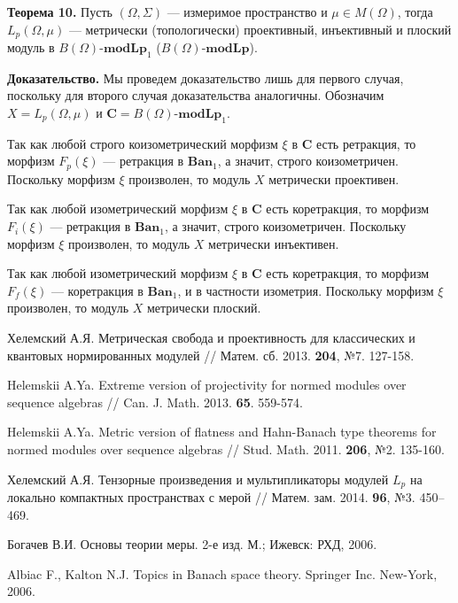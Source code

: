\documentclass[11pt,twoside]{article}
\begin{document}
\textbf{Теорема 10.} Пусть $(\Omega,\Sigma)$ --- измеримое пространство и $\mu\in M(\Omega)$, тогда $L_p(\Omega,\mu)$ --- метрически (топологически) проективный, инъективный и плоский модуль в $B(\Omega)$-$\mathbf{modLp}_1$ ($B(\Omega)$-$\mathbf{modLp}$).

\textbf{Доказательство.} Мы проведем доказательство лишь для первого случая, поскольку для второго случая доказательства аналогичны. Обозначим $X=L_p(\Omega,\mu)$ и $\mathbf{C}=B(\Omega)$-$\mathbf{modLp}_1$.  

Так как любой строго коизометрический морфизм $\xi$ в $\mathbf{C}$ есть ретракция, то морфизм $F_p(\xi)$ --- ретракция в $\mathbf{Ban}_1$, а значит, строго коизометричен. Поскольку морфизм $\xi$ произволен, то модуль $X$ метрически проективен.

Так как любой изометрический морфизм $\xi$ в $\mathbf{C}$ есть коретракция, то морфизм $F_i(\xi)$ --- ретракция в $\mathbf{Ban}_1$, а значит, строго коизометричен. Поскольку морфизм $\xi$ произволен, то модуль $X$ метрически инъективен.

Так как любой изометрический морфизм $\xi$ в $\mathbf{C}$ есть коретракция, то морфизм $F_f(\xi)$ --- коретракция в $\mathbf{Ban}_1$, и в частности изометрия. Поскольку морфизм $\xi$ произволен, то модуль $X$ метрически плоский.


\newpage


\textbf{\spisoklit}
{\small{}

{Хелемский А.Я.}
Метрическая свобода и проективность для классических и квантовых нормированных модулей
// Матем. сб. 2013. \textbf{204}, №7. 127-158.

{Helemskii A.Ya.}
Extreme version of projectivity for normed modules over sequence algebras
// Can. J. Math. 2013. \textbf{65}. 559-574.

{Helemskii A.Ya.}
Metric version of flatness and Hahn-Banach type theorems
for normed modules over sequence algebras
// Stud. Math. 2011. \textbf{206}, №2. 135-160.

{Хелемский А.Я.}
Тензорные произведения и мультипликаторы модулей $L_p$ на локально компактных пространствах с мерой 
// Матем. зам. 2014. \textbf{96}, №3. 450–469.


{Богачев В.И.}
Основы теории меры. 2-е изд. М.; Ижевск: РХД, 2006.

{Albiac F., Kalton N.J.}
Topics in Banach space theory. Springer Inc. New-York, 2006.


}
\lend
\end{document}
